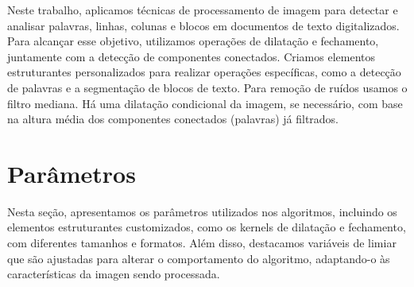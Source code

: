 \documentclass[english, 
               brazil, 
               bsc] %
               {dcomp-abntex2}
\begin{document}
Neste trabalho, aplicamos técnicas de processamento de imagem para detectar e analisar palavras, linhas, colunas e blocos em documentos de texto digitalizados. Para alcançar esse objetivo, utilizamos operações de dilatação e fechamento, juntamente com a detecção de componentes conectados. Criamos elementos estruturantes personalizados para realizar operações específicas, como a detecção de palavras e a segmentação de blocos de texto. Para remoção de ruídos usamos o filtro mediana. Há uma dilatação condicional da imagem, se necessário, com base na altura média dos componentes conectados (palavras) já filtrados.

\section{Parâmetros}
Nesta seção, apresentamos os parâmetros utilizados nos algoritmos, incluindo os elementos estruturantes customizados, como os kernels de dilatação e fechamento, com diferentes tamanhos e formatos. Além disso, destacamos variáveis de limiar que são ajustadas para alterar o comportamento do algoritmo, adaptando-o às características da imagen sendo processada.
\end{document}
